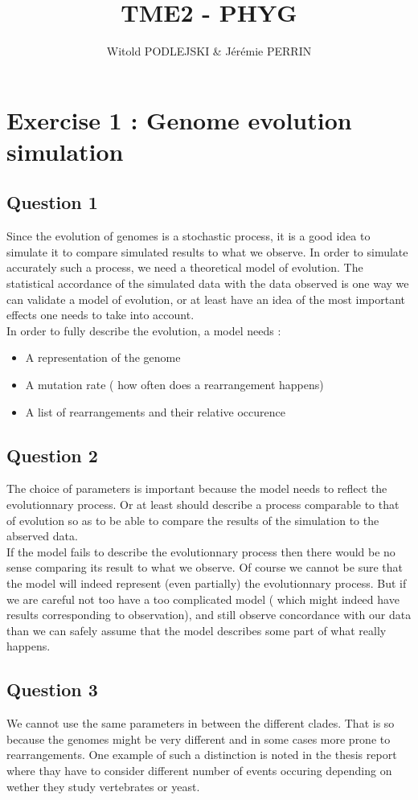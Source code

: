 \documentclass[]{article}
\title{TME2 - PHYG}
\author{Witold PODLEJSKI \& Jérémie PERRIN}
\theoremstyle{definition}
\begin{document}
\maketitle

\section{Exercise 1 : Genome evolution simulation}
\subsection{Question 1}
Since the evolution of genomes is a stochastic process, it is a good idea to simulate it to compare simulated results to what we observe. In order to simulate accurately such a process, we need a theoretical model of evolution. The statistical accordance of the simulated data with the data observed is one way we can validate a model of evolution, or at least have an idea of the most important effects one needs to take into account.\\
In order to fully describe the evolution, a model needs :
\begin{itemize}
	\item A representation of the genome
	\item A mutation rate ( how often does a rearrangement happens)
	\item A list of rearrangements and their relative occurence
\end{itemize}
 
\subsection{Question 2}
The choice of parameters is important because the model needs to reflect the evolutionnary process. Or at least should describe a process comparable to that of evolution so as to be able to compare the results of the simulation to the abserved data.\\
If the model fails to describe the evolutionnary process then there would be no sense comparing its result to what we observe. Of course we cannot be sure that the model will indeed represent (even partially) the evolutionnary process. But if we are careful not too have a too complicated model ( which might indeed have results corresponding to observation), and still observe concordance with our data than we can safely assume that the model describes some part of what really happens.

\subsection{Question 3}
We cannot use the same parameters in between the different clades. That is so because the genomes might be very different and in some cases more prone to rearrangements. One example of such a distinction is noted in the thesis report where thay have to consider different number of events occuring depending on wether they study vertebrates or yeast.
\end{document}
